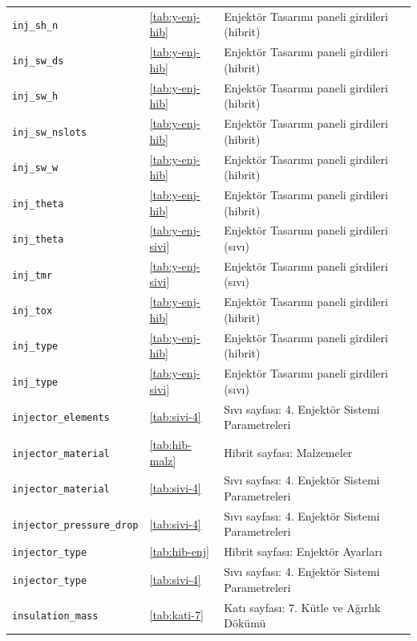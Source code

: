 \documentclass[11pt,a4paper]{article}
\begin{document}
{\begin{longtable}{@{}>{\raggedright\arraybackslash}p{5.2cm}p{1.4cm}>{\raggedright\arraybackslash}p{7.4cm}@{}}
\texttt{inj\_\allowbreak{}sh\_\allowbreak{}n} & \ref{tab:y-enj-hib} & Enjektör Tasarımı paneli girdileri (hibrit) \\
\texttt{inj\_\allowbreak{}sw\_\allowbreak{}ds} & \ref{tab:y-enj-hib} & Enjektör Tasarımı paneli girdileri (hibrit) \\
\texttt{inj\_\allowbreak{}sw\_\allowbreak{}h} & \ref{tab:y-enj-hib} & Enjektör Tasarımı paneli girdileri (hibrit) \\
\texttt{inj\_\allowbreak{}sw\_\allowbreak{}nslots} & \ref{tab:y-enj-hib} & Enjektör Tasarımı paneli girdileri (hibrit) \\
\texttt{inj\_\allowbreak{}sw\_\allowbreak{}w} & \ref{tab:y-enj-hib} & Enjektör Tasarımı paneli girdileri (hibrit) \\
\texttt{inj\_\allowbreak{}theta} & \ref{tab:y-enj-hib} & Enjektör Tasarımı paneli girdileri (hibrit) \\
\texttt{inj\_\allowbreak{}theta} & \ref{tab:y-enj-sivi} & Enjektör Tasarımı paneli girdileri (sıvı) \\
\texttt{inj\_\allowbreak{}tmr} & \ref{tab:y-enj-sivi} & Enjektör Tasarımı paneli girdileri (sıvı) \\
\texttt{inj\_\allowbreak{}tox} & \ref{tab:y-enj-hib} & Enjektör Tasarımı paneli girdileri (hibrit) \\
\texttt{inj\_\allowbreak{}type} & \ref{tab:y-enj-hib} & Enjektör Tasarımı paneli girdileri (hibrit) \\
\texttt{inj\_\allowbreak{}type} & \ref{tab:y-enj-sivi} & Enjektör Tasarımı paneli girdileri (sıvı) \\
\texttt{injector\_\allowbreak{}elements} & \ref{tab:sivi-4} & Sıvı sayfası: 4. Enjektör Sistemi Parametreleri \\
\texttt{injector\_\allowbreak{}material} & \ref{tab:hib-malz} & Hibrit sayfası: Malzemeler \\
\texttt{injector\_\allowbreak{}material} & \ref{tab:sivi-4} & Sıvı sayfası: 4. Enjektör Sistemi Parametreleri \\
\texttt{injector\_\allowbreak{}pressure\_\allowbreak{}drop} & \ref{tab:sivi-4} & Sıvı sayfası: 4. Enjektör Sistemi Parametreleri \\
\texttt{injector\_\allowbreak{}type} & \ref{tab:hib-enj} & Hibrit sayfası: Enjektör Ayarları \\
\texttt{injector\_\allowbreak{}type} & \ref{tab:sivi-4} & Sıvı sayfası: 4. Enjektör Sistemi Parametreleri \\
\texttt{insulation\_\allowbreak{}mass} & \ref{tab:kati-7} & Katı sayfası: 7. Kütle ve Ağırlık Dökümü \\

\end{longtable}}
\end{document}
